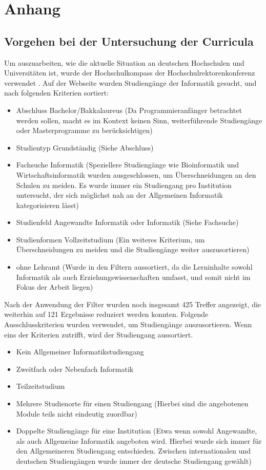 \clearpage
\section{Anhang}
\label{sec:appendix}

\subsection{Vorgehen bei der Untersuchung der Curricula}
Um auszuarbeiten, wie die aktuelle Situation an deutschen Hochschulen und Universitäten ist, wurde der Hochschulkompass der Hochschulrektorenkonferenz verwendet \cite{hochschulkompass}.
Auf der Webseite wurden Studiengänge der Informatik gesucht, und nach folgenden Kriterien sortiert:

\begin{itemize}
    \item Abschluss Bachelor/Bakkalaureus (Da Programmieranfänger betrachtet werden sollen, macht es im Kontext keinen Sinn, weiterführende Studiengänge oder Masterprogramme zu berücksichtigen)
    \item Studientyp Grundständig (Siehe Abschluss)
    \item Fachsuche Informatik (Speziellere Studiengänge wie Bioinformatik und Wirtschaftsinformatik wurden ausgeschlossen, um Überschneidungen an den Schulen zu meiden. Es wurde immer ein Studiengang pro Institution untersucht, der sich möglichst nah an der Allgemeinen Informatik kategorisieren lässt)
    \item Studienfeld Angewandte Informatik oder Informatik (Siehe Fachsuche)
    \item Studienformen Vollzeitstudium (Ein weiteres Kriterium, um Überschneidungen zu meiden und die Studiengänge weiter auszusortieren)
    \item ohne Lehramt (Wurde in den Filtern aussortiert, da die Lerninhalte sowohl Informatik als auch Erziehungswissenschaften umfasst, und somit nicht im Fokus der Arbeit liegen)
\end{itemize}

Nach der Anwendung der Filter wurden noch insgesamt 425 Treffer angezeigt, die weiterhin auf 121 Ergebnisse reduziert werden konnten. Folgende Ausschlusskriterien wurden verwendet, um Studiengänge auszusortieren. Wenn eins der Kriterien zutrifft, wird der Studiengang aussortiert.

\begin{itemize}
    \item Kein Allgemeiner Informatikstudiengang
    \item Zweitfach oder Nebenfach Informatik
    \item Teilzeitstudium
    \item Mehrere Studienorte für einen Studiengang (Hierbei sind die angebotenen Module teils nicht eindeutig zuordbar)
    \item Doppelte Studiengänge für eine Institution (Etwa wenn sowohl Angewandte, als auch Allgemeine Informatik angeboten wird. Hierbei wurde sich immer für den Allgemeineren Studiengang entschieden. Zwischen internationalen und deutschen Studiengängen wurde immer der deutsche Studiengang gewählt)
\end{itemize}

